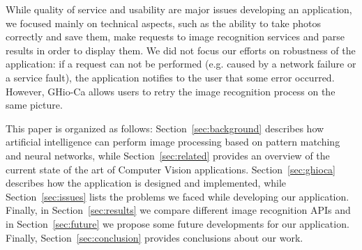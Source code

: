 While quality of service and usability are major issues developing an 
application, we focused mainly on technical aspects, such as the ability to 
take photos correctly and save them, make requests to image recognition 
services and parse results in order to display them. We did not focus our 
efforts on robustness of the application: if a request can not be performed 
(e.g. caused by a network failure or a service fault), the application 
notifies to the user that some error occurred. However, GHio-Ca allows users to retry the image recognition process on the same picture.

This paper is organized as follows: Section~\ref{sec:background} describes how 
artificial intelligence can perform image processing based on pattern matching 
and neural networks, while Section~\ref{sec:related} provides an overview of 
the current state of the art of Computer Vision applications. 
Section~\ref{sec:ghioca} describes how the application is designed and 
implemented, while Section~\ref{sec:issues} lists the problems we faced while 
developing our application. Finally, in Section~\ref{sec:results} we compare 
different image recognition APIs and in Section~\ref{sec:future} we propose 
some future developments for our application. Finally, Section~\ref{sec:conclusion} 
provides conclusions about our work.
